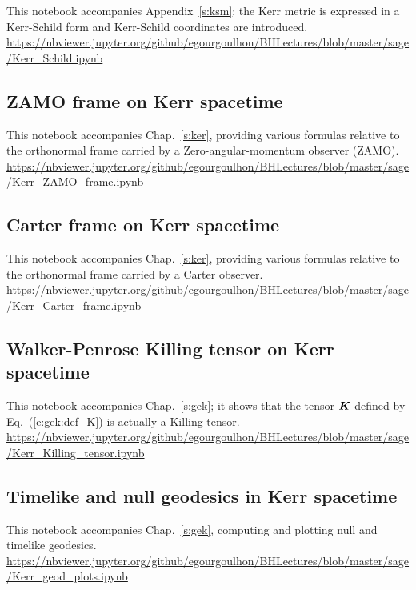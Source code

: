 This notebook accompanies Appendix~\ref{s:ksm}: the Kerr metric is expressed in
a Kerr-Schild form and Kerr-Schild coordinates are introduced.\\[1ex]
{\footnotesize
\url{https://nbviewer.jupyter.org/github/egourgoulhon/BHLectures/blob/master/sage/Kerr_Schild.ipynb}
}

\subsection{ZAMO frame on Kerr spacetime} \label{s:sam:Kerr_ZAMO_frame}

This notebook accompanies Chap.~\ref{s:ker}, providing various formulas relative to
the orthonormal frame carried by a Zero-angular-momentum observer (ZAMO).\\[1ex]
{\footnotesize
\url{https://nbviewer.jupyter.org/github/egourgoulhon/BHLectures/blob/master/sage/Kerr_ZAMO_frame.ipynb}
}

\subsection{Carter frame on Kerr spacetime} \label{s:sam:Kerr_Carter_frame}

This notebook accompanies Chap.~\ref{s:ker}, providing various formulas relative to
the orthonormal frame carried by a Carter observer.\\[1ex]
{\footnotesize
\url{https://nbviewer.jupyter.org/github/egourgoulhon/BHLectures/blob/master/sage/Kerr_Carter_frame.ipynb}
}


\subsection{Walker-Penrose Killing tensor on Kerr spacetime} \label{s:sam:Kerr_Killing_tensor}

This notebook accompanies Chap.~\ref{s:gek}; it shows that the
tensor $\bm{K}$ defined by Eq.~(\ref{e:gek:def_K}) is actually a Killing tensor.\\[1ex]
{\footnotesize
\url{https://nbviewer.jupyter.org/github/egourgoulhon/BHLectures/blob/master/sage/Kerr_Killing_tensor.ipynb}
}


\subsection{Timelike and null geodesics in Kerr spacetime} \label{s:sam:Kerr_geod_plots}

This notebook accompanies Chap.~\ref{s:gek}, computing and plotting null and timelike geodesics.\\[1ex]
{\footnotesize
\url{https://nbviewer.jupyter.org/github/egourgoulhon/BHLectures/blob/master/sage/Kerr_geod_plots.ipynb}
}

